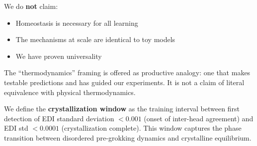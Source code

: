 We do \textbf{not} claim:
\begin{itemize}
    \item Homeostasis is necessary for all learning
    \item The mechanisms at scale are identical to toy models
    \item We have proven universality
\end{itemize}

The ``thermodynamics'' framing is offered as productive analogy: one that makes testable predictions and has guided our experiments. It is not a claim of literal equivalence with physical thermodynamics.

We define the \textbf{crystallization window} as the training interval between first detection of EDI standard deviation $<0.001$ (onset of inter-head agreement) and EDI std $<0.0001$ (crystallization complete). This window captures the phase transition between disordered pre-grokking dynamics and crystalline equilibrium.

